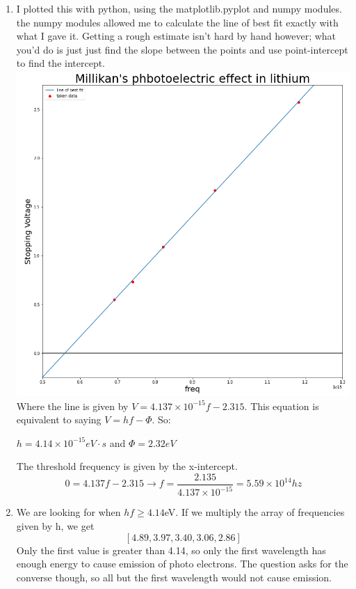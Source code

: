 \documentclass[11pt]{article}
\begin{document}
\begin{enumerate}[label=\alph*)]
    \item I plotted this with python, using the matplotlib.pyplot and numpy modules. the numpy modules allowed me to calculate the line of best fit exactly with what I gave it. Getting a rough estimate isn't hard by hand however; what you'd do is just just find the slope between the points and use point-intercept to find the intercept.\\
    \includegraphics[width = \linewidth]{Homework12/question 2.PNG}\\
    Where the line is given by $V = 4.137 \times 10^{-15} f - 2.315$. This equation is equivalent to saying $V = hf -\Phi$. So:
    \begin{center}
        $\boxed{h = 4.14 \times 10^{-15}eV\cdot s}$ and $\boxed{\Phi = 2.32eV}$
    \end{center}
    The threshold frequency is given by the x-intercept. 
    \[0 = 4.137f-2.315 \rightarrow f = \frac{2.135}{4.137 \times 10^{-15}} =\boxed{ 5.59 \times 10^{14} hz}\]
    \item 
        We are looking for when $hf \geq 4.14$eV. If we multiply the array of frequencies given by h, we get
        \[[4.89, 3.97, 3.40, 3.06, 2.86]\]
        Only the first value is greater than 4.14, so only the first wavelength has enough energy to cause emission of photo electrons. The question asks for the converse though, so all but the first wavelength would not cause emission. 
\end{enumerate}
\end{document}
